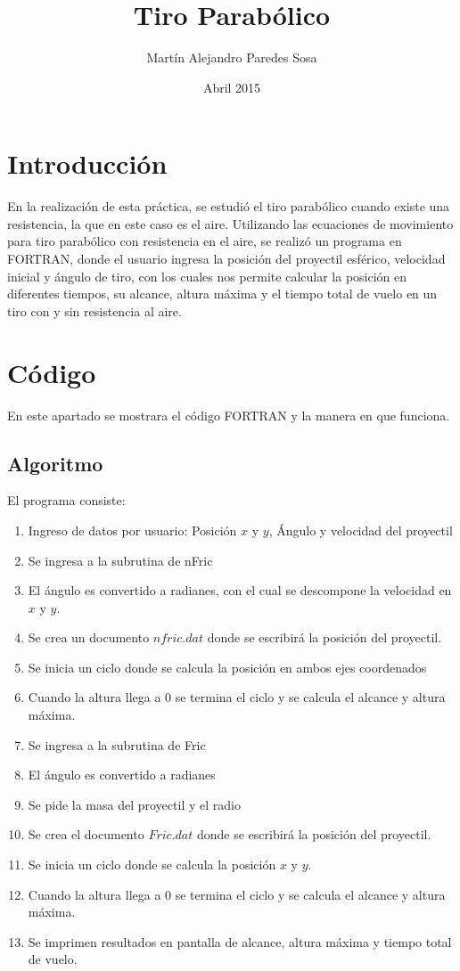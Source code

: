 \documentclass[12pt]{article}
\title{Tiro Parabólico}
\author{Martín Alejandro Paredes Sosa}
\date{Abril 2015}
\begin{document}
\maketitle

\section{Introducción}
En la realización de esta práctica, se estudió el tiro parabólico cuando existe una resistencia, la que en este caso es el aire. Utilizando las ecuaciones de movimiento para tiro parabólico con resistencia en el aire, se realizó un programa en FORTRAN, donde el usuario ingresa la posición del proyectil esférico, velocidad inicial y ángulo de tiro, con los cuales nos permite calcular la posición en diferentes tiempos, su alcance, altura máxima y el tiempo total de vuelo en un tiro con y sin resistencia al aire.

\section{Código}
En este apartado se mostrara el código FORTRAN y la manera en que funciona.
\subsection{Algoritmo}
El programa consiste:
	\begin{enumerate}
	\item Ingreso de datos por usuario:  Posición $x$ y $y$, Ángulo y velocidad del proyectil
	\item Se ingresa a la subrutina de nFric
	\item El ángulo es convertido a radianes, con el cual se descompone la velocidad en $x$ y $y$.
	\item Se crea un documento $nfric.dat$ donde se escribirá la posición del proyectil.
	\item Se inicia un ciclo donde se calcula la posición en ambos ejes coordenados
	\item Cuando la altura llega a 0 se termina el ciclo y se calcula el alcance y altura máxima.
	\item Se ingresa a la subrutina de Fric
	\item El ángulo es convertido a radianes
	\item Se pide la masa del proyectil y el radio
	\item Se crea el documento $Fric.dat$ donde se escribirá la posición del proyectil.
	\item Se inicia un ciclo donde se calcula la posición $x$ y $y$.
	\item Cuando la altura llega a 0 se termina el ciclo y se calcula el alcance y altura máxima.
	\item Se imprimen resultados en pantalla de alcance, altura máxima y tiempo total de vuelo.
\end{enumerate}
\end{document}
